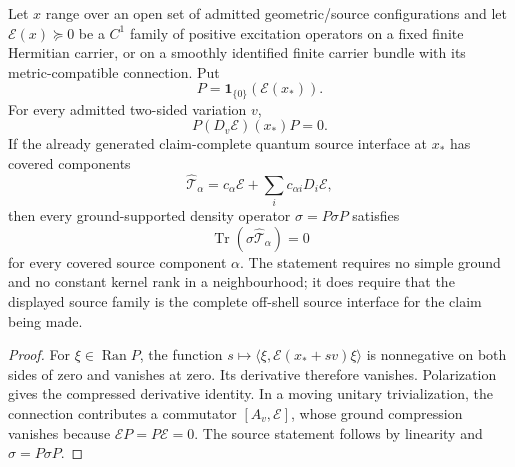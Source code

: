 \documentclass[12pt,a4paper]{article}
\begin{document}
\begin{theorem}
\label{p4:thm:v2114-positive-family-ground-source}
Let \(x\) range over an open set of admitted geometric/source configurations
and let \(\mathcal E(x)\succeq0\) be a \(C^1\) family of positive excitation
operators on a fixed finite Hermitian carrier, or on a smoothly identified
finite carrier bundle with its metric-compatible connection.  Put
\[
 P=\mathbf1_{\{0\}}(\mathcal E(x_*)).
\]
For every admitted two-sided variation \(v\),
\[
 \boxed{P(D_v\mathcal E)(x_*)P=0.}
\]
If the already generated claim-complete quantum source interface at \(x_*\)
has covered components
\[
 \widehat{\mathcal T}_\alpha
 =c_\alpha\mathcal E+\sum_i c_{\alpha i}D_i\mathcal E,
\]
then every ground-supported density operator \(\sigma=P\sigma P\) satisfies
\[
 \boxed{\operatorname{Tr}(\sigma\widehat{\mathcal T}_\alpha)=0}
\]
for every covered source component \(\alpha\).  The statement requires no
simple ground and no constant kernel rank in a neighbourhood; it does require
that the displayed source family is the complete off-shell source interface
for the claim being made.
\end{theorem}

\begin{proof}
For \(\xi\in\operatorname{Ran}P\), the function
\(s\mapsto\langle\xi,\mathcal E(x_*+sv)\xi\rangle\) is nonnegative on both
sides of zero and vanishes at zero.  Its derivative therefore vanishes.
Polarization gives the compressed derivative identity.  In a moving unitary
trivialization, the connection contributes a commutator
\([A_v,\mathcal E]\), whose ground compression vanishes because
\(\mathcal EP=P\mathcal E=0\).  The source statement follows by linearity
and \(\sigma=P\sigma P\).
\end{proof}
\end{document}
